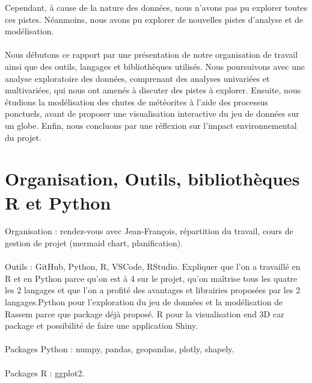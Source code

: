 \documentclass[12pt]{article}
\begin{document}
Cependant, à cause de la nature des données, nous n'avons pas pu explorer toutes ces pistes. Néanmoins, nous avons pu explorer de nouvelles pistes d'analyse et de modélisation.\\
\\
Nous débutons ce rapport par une présentation de notre organisation de travail ainsi que des outils, langages et bibliothèques utilisés. Nous poursuivons avec une analyse exploratoire des données, comprenant des analyses univariées et multivariées, qui nous ont amenés à discuter des pistes à explorer. Ensuite, nous étudions la modélisation des chutes de météorites à l'aide des processus ponctuels, avant de proposer une visualisation interactive du jeu de données sur un globe. Enfin, nous concluons par une réflexion sur l'impact environnemental du projet.\\
\newpage
\section{Organisation, Outils, bibliothèques R et Python}
Organisation : rendez-vous avec Jean-François, répartition du travail, cours de gestion de projet (mermaid chart, planification).\\
\\
Outils : GitHub, Python, R, VSCode, RStudio. Expliquer que l'on a travaillé en R et en Python parce qu'on est à 4 sur le projet, qu'on maîtrise tous les quatre les 2 langages et que l'on a profité des avantages et librairies proposées par les 2 langages.Python pour l'exploration du jeu de données et la modélisation de Rassem parce que package déjà proposé. R pour la visualisation end 3D car package et possibilité de faire une application Shiny.\\
\\
Packages Python : numpy, pandas, geopandas, plotly, shapely.\\
\\
Packages R : ggplot2.\\ 
\\
\end{document}
